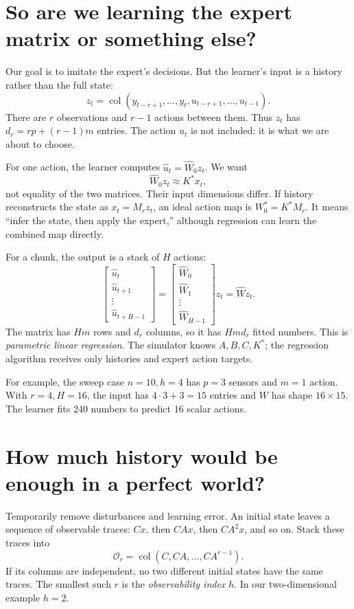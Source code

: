 \documentclass[12 pt]{article}        	%
\theoremstyle{definition}
\begin{document}
\section{So are we learning the expert matrix or something else?}
Our goal is to imitate the expert's decisions. But the learner's input is a history rather than the full state:
\[
z_t=\operatorname{col}(y_{t-r+1},\ldots,y_t,
                       u_{t-r+1},\ldots,u_{t-1}).
\]
There are $r$ observations and $r-1$ actions between them. Thus $z_t$ has $d_r=rp+(r-1)m$ entries. The action $u_t$ is not included: it is what we are about to choose.

For one action, the learner computes $\widehat u_t=\widehat W_0z_t$. We want
\[
\boxed{\widehat W_0z_t\approx K^*x_t,}
\]
not equality of the two matrices. Their input dimensions differ. If history reconstructs the state as $x_t=M_rz_t$, an ideal action map is $W_0^*=K^*M_r$. It means ``infer the state, then apply the expert,'' although regression can learn the combined map directly.

For a chunk, the output is a stack of $H$ actions:
\[
\begin{bmatrix}\widehat u_t\\\widehat u_{t+1}\\\vdots\\\widehat u_{t+H-1}\end{bmatrix}
=\begin{bmatrix}\widehat W_0\\\widehat W_1\\\vdots\\\widehat W_{H-1}\end{bmatrix}z_t
=\widehat Wz_t.
\]
The matrix has $Hm$ rows and $d_r$ columns, so it has $Hm d_r$ fitted numbers. This is \emph{parametric linear regression}. The simulator knows $A,B,C,K^*$; the regression algorithm receives only histories and expert action targets.

For example, the sweep case $n=10,h=4$ has $p=3$ sensors and $m=1$ action. With $r=4,H=16$, the input has $4\cdot3+3=15$ entries and $W$ has shape $16\times15$. The learner fits 240 numbers to predict 16 scalar actions.

\section{How much history would be enough in a perfect world?}
Temporarily remove disturbances and learning error. An initial state leaves a sequence of observable traces: $Cx$, then $CAx$, then $CA^2x$, and so on. Stack these traces into
\[
\mathcal O_r=\operatorname{col}(C,CA,\ldots,CA^{r-1}).
\]
If its columns are independent, no two different initial states have the same traces. The smallest such $r$ is the \emph{observability index} $h$. In our two-dimensional example $h=2$.
\end{document}
